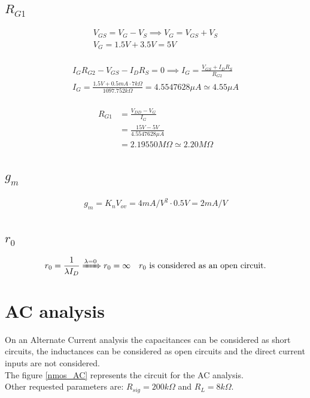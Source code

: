 \documentclass[10pt,a4paper]{book}
\begin{document}
\subsection{$R_{G1}$}
\begin{align}
V_{GS} = V_G - V_S \implies
V_G = V_{GS} + V_S\\
V_G = 1.5V + 3.5V = 5V\\
\end{align}

\begin{align}
I_G R_{G2} - V_{GS} - I_D R_S = 0 \implies
I_G = \frac{V_{GS}+I_D R_S}{R_{G2}}\\
I_G = \frac{1.5V + 0.5mA \cdot 7k\Omega}{1097.752k\Omega} = 4.5547628\mu A \simeq 4.55 \mu A\\
\end{align}

\begin{align}
R_{G1} &= \frac{V_{DD} - V_G}{I_G}\\
&= \frac{15V - 5V}{4.5547628 \mu A}\\
&=2.19550 M\Omega \simeq 2.20 M\Omega
\end{align}

\subsection{$g_m$}
\begin{align}
g_m = K_n V_{ov} = 4 mA/V^2 \cdot 0.5V = 2 mA/V
\end{align}

\subsection{$r_0$}
\begin{gather}
r_0 = \frac{1}{\lambda I_D} \xRightarrow{\lambda = 0} r_0 = \infty  \quad r_0 \text{ is considered as an open circuit.}\\
\end{gather}


\section{AC analysis}
On an Alternate Current analysis the capacitances can be considered as short circuits, the inductances can be considered as open circuits and the direct current inputs are not considered.\\
The figure \ref{nmos_AC} represents the circuit for the AC analysis.\\
Other requested parameters are: $R_{sig} = 200k\Omega$ and $R_L = 8k\Omega$.\par
\end{document}
